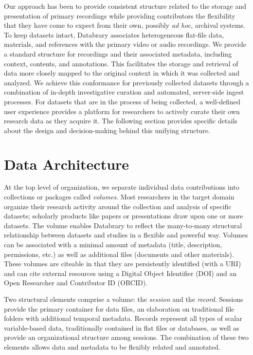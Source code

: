 \documentclass{sig-alternate}
\begin{document}
Our approach has been to provide consistent structure related to the storage and presentation of primary recordings while providing contributors the flexibility that they have come to expect from their own, possibly \emph{ad hoc}, archival systems.
To keep datasets intact, Databrary associates heterogeneous flat-file data, materials, and references with the primary video or audio recordings.
We provide a standard structure for recordings and their associated metadata, including context, contents, and annotations. This facilitates the storage and retrieval of data more closely mapped to the original context in which it was collected and analyzed.
We achieve this conformance for previously collected datasets through a combination of in-depth investigative curation and automated, server-side ingest processes.
For datasets that are in the process of being collected, a well-defined user experience provides a platform for researchers to actively curate their own research data as they acquire it.
The following section provides specific details about the design and decision-making behind this unifying structure.

\section{Data Architecture}


At the top level of organization, we separate individual data contributions into collections or packages called \emph{volumes}.
Most researchers in the target domain organize their research activity around the collection and analysis of specific datasets; scholarly products like papers or presentations draw upon one or more datasets. 
The volume enables Databrary to reflect the many-to-many structural relationship between datasets and studies in a flexible and powerful way.
Volumes can be associated with a minimal amount of metadata (title, description, permissions, etc.) as well as additional files (documents and other materials).
These volumes are citeable in that they are persistently identified (with a URI) and can cite external resources using a Digital Object Identifier (DOI) and an Open Researcher and Contributor ID (ORCID).

Two structural elements comprise a volume: the \emph{session} and the \emph{record}.
Sessions provide the primary container for data files, an elaboration on traditional file folders with additional temporal metadata. 
Records represent all types of scalar variable-based data, traditionally contained in flat files or databases, as well as provide an organizational structure among sessions.
The combination of these two elements allows data and metadata to be flexibly related and annotated.
\end{document}
